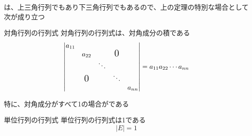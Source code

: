 \documentclass[../../../topic_linear-algebra]{subfiles}
\begin{document}
\sectionline

は、上三角行列でもあり下三角行列でもあるので、上の定理の特別な場合として次が成り立つ

\begin{theorem*}{対角行列の行列式}
  対角行列の行列式は、対角成分の積である
  \begin{equation*}
    \left|\begin{matrix}
      a_{11}                                                   \\
       & a_{22}           &        & \text{\Large{0}}          \\
       &                  & \ddots                             \\
       & \text{\Large{0}} &        & \ddots                    \\
       &                  &        &                  & a_{nn}
    \end{matrix}\right| = a_{11} a_{22} \cdots a_{nn}
  \end{equation*}
\end{theorem*}

特に、対角成分がすべて1の場合がである

\begin{theorem*}{単位行列の行列式}
  単位行列の行列式は1である
  \begin{equation*}
    | E | = 1
  \end{equation*}
\end{theorem*}
\end{document}
